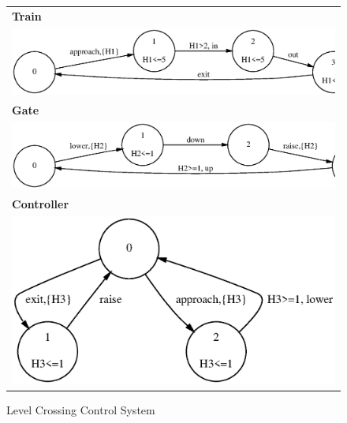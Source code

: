 {\begin{figure}
\begin{center}
\begin{tabular}{|c|}
\hline
\multicolumn{1}{|l|}{\bf Train} \\
\includegraphics[width=.75\linewidth]{METHODS/train.eps} \\
\hline
\multicolumn{1}{|l|}{\bf Gate} \\
\includegraphics[width=.75\linewidth]{METHODS/gate.eps} \\
\hline
\multicolumn{1}{|l|}{\bf Controller} \\
\includegraphics[width=.5\linewidth]{METHODS/controller.eps} \\
\hline
\end{tabular}
\end{center}
\caption{Level Crossing Control System\label{fig:tgc}}
\end{figure}

}
